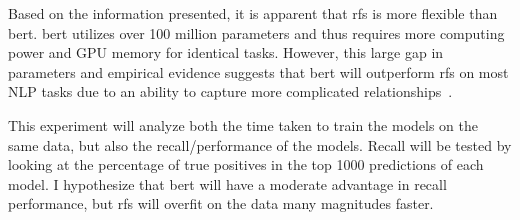 Based on the information presented, it is apparent that \acrlong{rfs} is more flexible than \acrshort{bert}. \acrshort{bert} utilizes over 100 million parameters and thus requires more computing power and GPU memory for identical tasks. However, this large gap in parameters and empirical evidence suggests that \acrshort{bert} will outperform \gls{rfs} on most NLP tasks due to an ability to capture more complicated relationships~\parencite{devlin2019bert:}.

This experiment will analyze both the time taken to train the models on the same data, but also the recall/performance of the models. Recall will be tested by looking at the percentage of true positives in the top 1000 predictions of each model. I hypothesize that \acrshort{bert} will have a moderate advantage in recall performance, but \acrshort{rfs} will overfit on the data many magnitudes faster.